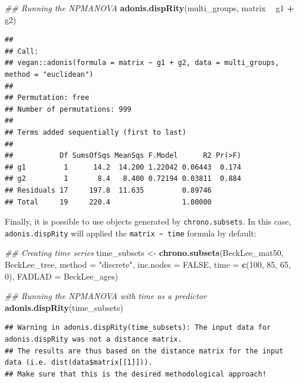 \documentclass[]{book}
\newenvironment{Shaded}{\begin{snugshade}}{\end{snugshade}}
\newcommand{\CommentTok}[1]{\textcolor[rgb]{0.56,0.35,0.01}{\textit{#1}}}
\newcommand{\DataTypeTok}[1]{\textcolor[rgb]{0.13,0.29,0.53}{#1}}
\newcommand{\DecValTok}[1]{\textcolor[rgb]{0.00,0.00,0.81}{#1}}
\newcommand{\KeywordTok}[1]{\textcolor[rgb]{0.13,0.29,0.53}{\textbf{#1}}}
\newcommand{\NormalTok}[1]{#1}
\newcommand{\OperatorTok}[1]{\textcolor[rgb]{0.81,0.36,0.00}{\textbf{#1}}}
\newcommand{\OtherTok}[1]{\textcolor[rgb]{0.56,0.35,0.01}{#1}}
\newcommand{\StringTok}[1]{\textcolor[rgb]{0.31,0.60,0.02}{#1}}
\begin{document}
\begin{Shaded}
\begin{Highlighting}[]
\CommentTok{## Running the NPMANOVA}
\KeywordTok{adonis.dispRity}\NormalTok{(multi_groups, matrix }\OperatorTok{~}\StringTok{ }\NormalTok{g1 }\OperatorTok{+}\StringTok{ }\NormalTok{g2)}
\end{Highlighting}
\end{Shaded}

\begin{verbatim}
## 
## Call:
## vegan::adonis(formula = matrix ~ g1 + g2, data = multi_groups,      method = "euclidean") 
## 
## Permutation: free
## Number of permutations: 999
## 
## Terms added sequentially (first to last)
## 
##           Df SumsOfSqs MeanSqs F.Model      R2 Pr(>F)
## g1         1      14.2  14.200 1.22042 0.06443  0.174
## g2         1       8.4   8.400 0.72194 0.03811  0.884
## Residuals 17     197.8  11.635         0.89746       
## Total     19     220.4                 1.00000
\end{verbatim}

Finally, it is possible to use objects generated by \texttt{chrono.subsets}.
In this case, \texttt{adonis.dispRity} will applied the \texttt{matrix\ \textasciitilde{}\ time} formula by default:

\begin{Shaded}
\begin{Highlighting}[]
\CommentTok{## Creating time series}
\NormalTok{time_subsets <-}\StringTok{ }\KeywordTok{chrono.subsets}\NormalTok{(BeckLee_mat50, BeckLee_tree,}
                               \DataTypeTok{method =} \StringTok{"discrete"}\NormalTok{,}
                               \DataTypeTok{inc.nodes =} \OtherTok{FALSE}\NormalTok{,}
                               \DataTypeTok{time =} \KeywordTok{c}\NormalTok{(}\DecValTok{100}\NormalTok{, }\DecValTok{85}\NormalTok{, }\DecValTok{65}\NormalTok{, }\DecValTok{0}\NormalTok{),}
                               \DataTypeTok{FADLAD =}\NormalTok{ BeckLee_ages)}

\CommentTok{## Running the NPMANOVA with time as a predictor}
\KeywordTok{adonis.dispRity}\NormalTok{(time_subsets)}
\end{Highlighting}
\end{Shaded}

\begin{verbatim}
## Warning in adonis.dispRity(time_subsets): The input data for adonis.dispRity was not a distance matrix.
## The results are thus based on the distance matrix for the input data (i.e. dist(data$matrix[[1]])).
## Make sure that this is the desired methodological approach!
\end{verbatim}
\end{document}
